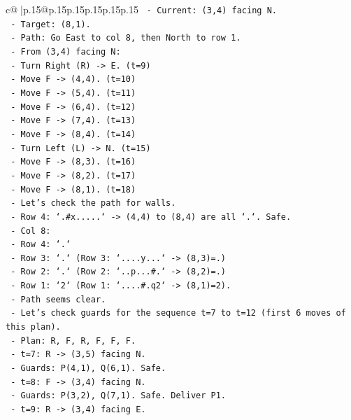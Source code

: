 \documentclass{article}
\begin{document}
{\begin{supertabular}{c@{$\;$}|p{.15\linewidth}@{}p{.15\linewidth}p{.15\linewidth}p{.15\linewidth}p{.15\linewidth}p{.15\linewidth}}
{{{\texttt{   {-} Current: (3,4) facing N.} \\
\texttt{   {-} Target: (8,1).} \\
\texttt{   {-} Path: Go East to col 8, then North to row 1.} \\
\texttt{   {-} From (3,4) facing N:} \\
\texttt{     {-} Turn Right (R) {-}> E. (t=9)} \\
\texttt{     {-} Move F {-}> (4,4). (t=10)} \\
\texttt{     {-} Move F {-}> (5,4). (t=11)} \\
\texttt{     {-} Move F {-}> (6,4). (t=12)} \\
\texttt{     {-} Move F {-}> (7,4). (t=13)} \\
\texttt{     {-} Move F {-}> (8,4). (t=14)} \\
\texttt{     {-} Turn Left (L) {-}> N. (t=15)} \\
\texttt{     {-} Move F {-}> (8,3). (t=16)} \\
\texttt{     {-} Move F {-}> (8,2). (t=17)} \\
\texttt{     {-} Move F {-}> (8,1). (t=18)} \\
\texttt{   {-} Let's check the path for walls.} \\
\texttt{     {-} Row 4: `.\#x.....` {-}> (4,4) to (8,4) are all `.`. Safe.} \\
\texttt{     {-} Col 8:} \\
\texttt{       {-} Row 4: `.`} \\
\texttt{       {-} Row 3: `.` (Row 3: `....y...` {-}> (8,3)=.)} \\
\texttt{       {-} Row 2: `.` (Row 2: `..p...\#.` {-}> (8,2)=.)} \\
\texttt{       {-} Row 1: `2` (Row 1: `....\#.q2` {-}> (8,1)=2).} \\
\texttt{     {-} Path seems clear.} \\
\texttt{   {-} Let's check guards for the sequence t=7 to t=12 (first 6 moves of this plan).} \\
\texttt{   {-} Plan: R, F, R, F, F, F.} \\
\texttt{   {-} t=7: R {-}> (3,5) facing N.} \\
\texttt{     {-} Guards: P(4,1), Q(6,1). Safe.} \\
\texttt{   {-} t=8: F {-}> (3,4) facing N.} \\
\texttt{     {-} Guards: P(3,2), Q(7,1). Safe. Deliver P1.} \\
\texttt{   {-} t=9: R {-}> (3,4) facing E.} \\
}}}
\end{supertabular}}
\end{document}
